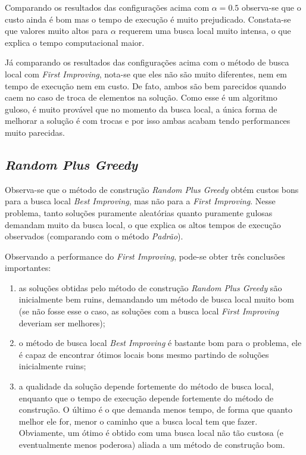 \documentclass{article}
\theoremstyle{definition}
\newcommand{\firstImproving}{\textit{First Improving}\xspace}
\newcommand{\bestImproving}{\textit{Best Improving}\xspace}
\newcommand{\default}{\textit{Padrão}\xspace}
\newcommand{\randomPlusGreedy}{\textit{Random Plus Greedy}\xspace}
\begin{document}
Comparando os resultados das configurações acima com $\alpha = 0.5$ observa-se que o custo ainda é bom mas o tempo de execução é muito prejudicado. Constata-se que valores muito altos para $\alpha$ requerem uma busca local muito intensa, o que explica o tempo computacional maior.

Já comparando os resultados das configurações acima com o método de busca local com \firstImproving, nota-se que eles não são muito diferentes, nem em tempo de execução nem em custo. De fato, ambos são bem parecidos quando caem no caso de troca de elementos na solução. Como esse é um algoritmo guloso, é muito provável que no momento da busca local, a única forma de melhorar a solução é com trocas e por isso ambas acabam tendo performances muito parecidas.

\subsection{\randomPlusGreedy}
\label{subsec:random-plus-greedy}

Observa-se que o método de construção \randomPlusGreedy obtém custos bons para a busca local \bestImproving, mas não para a \firstImproving. Nesse problema, tanto soluções puramente aleatórias quanto puramente gulosas demandam muito da busca local, o que explica os altos tempos de execução observados (comparando com o método \default).

Observando a performance do \firstImproving, pode-se obter três conclusões importantes:

\begin{enumerate}
    \item as soluções obtidas pelo método de construção \randomPlusGreedy são inicialmente bem ruins, demandando um método de busca local muito bom (se não fosse esse o caso, as soluções com a busca local \firstImproving deveriam ser melhores);
    \item o método de busca local \bestImproving é bastante bom para o problema, ele é capaz de encontrar ótimos locais bons mesmo partindo de soluções inicialmente ruins;
    \item a qualidade da solução depende fortemente do método de busca local, enquanto que o tempo de execução depende fortemente do método de construção. O último é o que demanda menos tempo, de forma que quanto melhor ele for, menor o caminho que a busca local tem que fazer. Obviamente, um ótimo é obtido com uma busca local não tão custosa (e eventualmente menos poderosa) aliada a um método de construção bom.
\end{enumerate}
\end{document}
